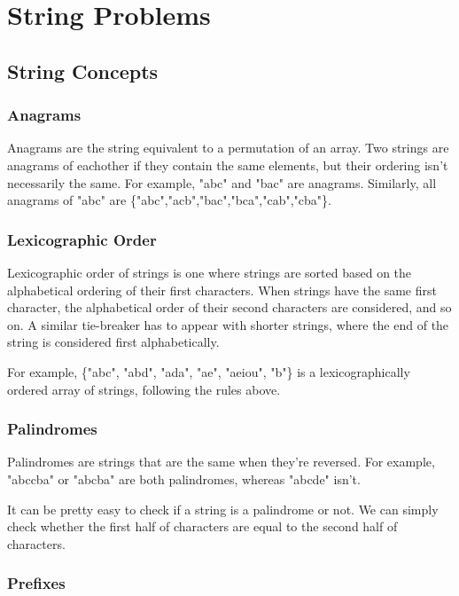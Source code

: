 \section{String Problems}
\subsection{String Concepts}

\subsubsection{Anagrams}

Anagrams are the string equivalent to a permutation of an array. Two strings are anagrams of eachother if they contain the same elements, but their ordering isn't necessarily the same. For example, "abc" and "bac" are anagrams. Similarly, all anagrams of "abc" are \{"abc","acb","bac","bca","cab","cba"\}.

\subsubsection{Lexicographic Order}

Lexicographic order of strings is one where strings are sorted based on the alphabetical ordering of their first characters. When strings have the same first character, the alphabetical order of their second characters are considered, and so on. A similar tie-breaker has to appear with shorter strings, where the end of the string is considered first alphabetically.

For example, \{"abc", "abd", "ada", "ae", "aeiou", "b"\} is a lexicographically ordered array of strings, following the rules above.

\subsubsection{Palindromes}

Palindromes are strings that are the same when they're reversed. For example, "abccba" or "abcba" are both palindromes, whereas "abcde" isn't.

It can be pretty easy to check if a string is a palindrome or not. We can simply check whether the first half of characters are equal to the second half of characters.


\subsubsection{Prefixes}


